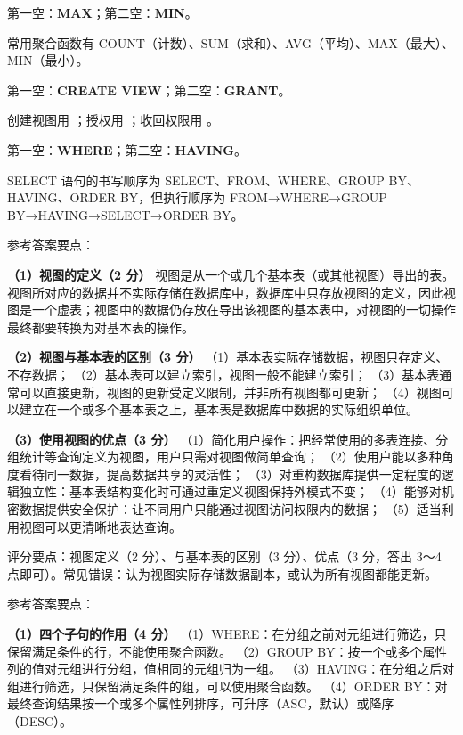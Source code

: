 \documentclass[a4paper,11pt]{article}
\begin{document}
\q 第一空：\textbf{MAX}；第二空：\textbf{MIN}。\begin{analysis}常用聚合函数有 COUNT（计数）、SUM（求和）、AVG（平均）、MAX（最大）、MIN（最小）。\end{analysis}

\q 第一空：\textbf{CREATE VIEW}；第二空：\textbf{GRANT}。\begin{analysis}创建视图用 ；授权用 ；收回权限用 。\end{analysis}

\q 第一空：\textbf{WHERE}；第二空：\textbf{HAVING}。\begin{analysis}SELECT 语句的书写顺序为 SELECT、FROM、WHERE、GROUP BY、HAVING、ORDER BY，但执行顺序为 FROM→WHERE→GROUP BY→HAVING→SELECT→ORDER BY。\end{analysis}


\q 参考答案要点：

\textbf{（1）视图的定义（2 分）}
视图是从一个或几个基本表（或其他视图）导出的表。视图所对应的数据并不实际存储在数据库中，数据库中只存放视图的定义，因此视图是一个虚表；视图中的数据仍存放在导出该视图的基本表中，对视图的一切操作最终都要转换为对基本表的操作。

\textbf{（2）视图与基本表的区别（3 分）}
（1）基本表实际存储数据，视图只存定义、不存数据；
（2）基本表可以建立索引，视图一般不能建立索引；
（3）基本表通常可以直接更新，视图的更新受定义限制，并非所有视图都可更新；
（4）视图可以建立在一个或多个基本表之上，基本表是数据库中数据的实际组织单位。

\textbf{（3）使用视图的优点（3 分）}
（1）简化用户操作：把经常使用的多表连接、分组统计等查询定义为视图，用户只需对视图做简单查询；
（2）使用户能以多种角度看待同一数据，提高数据共享的灵活性；
（3）对重构数据库提供一定程度的逻辑独立性：基本表结构变化时可通过重定义视图保持外模式不变；
（4）能够对机密数据提供安全保护：让不同用户只能通过视图访问权限内的数据；
（5）适当利用视图可以更清晰地表达查询。
\begin{analysis}评分要点：视图定义（2 分）、与基本表的区别（3 分）、优点（3 分，答出 3～4 点即可）。常见错误：认为视图实际存储数据副本，或认为所有视图都能更新。\end{analysis}

\q 参考答案要点：

\textbf{（1）四个子句的作用（4 分）}
（1）WHERE：在分组之前对元组进行筛选，只保留满足条件的行，不能使用聚合函数。
（2）GROUP BY：按一个或多个属性列的值对元组进行分组，值相同的元组归为一组。
（3）HAVING：在分组之后对组进行筛选，只保留满足条件的组，可以使用聚合函数。
（4）ORDER BY：对最终查询结果按一个或多个属性列排序，可升序（ASC，默认）或降序（DESC）。
\end{document}
